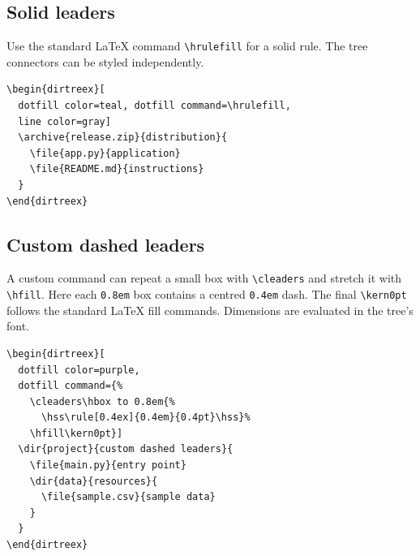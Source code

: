 \documentclass[11pt]{article}
\begin{document}
\begin{dirtreex}[dotfill color=blue!60]
\end{dirtreex}

\subsection{Solid leaders}

Use the standard \LaTeX{} command \verb|\hrulefill| for a solid rule.
The tree connectors can be styled independently.

\begin{Verbatim}
\begin{dirtreex}[
  dotfill color=teal, dotfill command=\hrulefill,
  line color=gray]
  \archive{release.zip}{distribution}{
    \file{app.py}{application}
    \file{README.md}{instructions}
  }
\end{dirtreex}
\end{Verbatim}

\begin{dirtreex}[
  dotfill color=teal, dotfill command=\hrulefill,
  line color=gray]
\end{dirtreex}

\clearpage

\subsection{Custom dashed leaders}

A custom command can repeat a small box with \verb|\cleaders| and stretch
it with \verb|\hfill|. Here each \verb|0.8em| box contains a centred
\verb|0.4em| dash. The final \verb|\kern0pt| follows the standard
\LaTeX{} fill commands. Dimensions are evaluated in the tree's font.

\begin{Verbatim}
\begin{dirtreex}[
  dotfill color=purple,
  dotfill command={%
    \cleaders\hbox to 0.8em{%
      \hss\rule[0.4ex]{0.4em}{0.4pt}\hss}%
    \hfill\kern0pt}]
  \dir{project}{custom dashed leaders}{
    \file{main.py}{entry point}
    \dir{data}{resources}{
      \file{sample.csv}{sample data}
    }
  }
\end{dirtreex}
\end{Verbatim}
\end{document}

